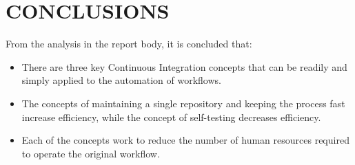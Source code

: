 \section{CONCLUSIONS} %
\label{sec:conclusions}
From the analysis in the report body, it is concluded that:\\

\begin{itemize}
	\item There are three key Continuous Integration concepts that can be readily and simply applied to the automation of workflows.
	
	\item The concepts of maintaining a single repository and keeping the process fast increase efficiency, while the concept of self-testing decreases efficiency.
	
	\item Each of the concepts work to reduce the number of human resources required to operate the original workflow.
\end{itemize}
